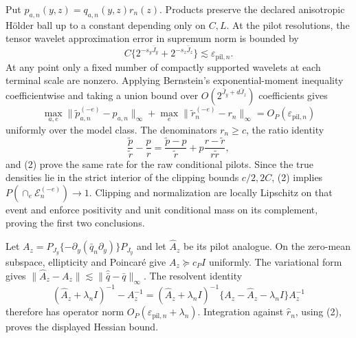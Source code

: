 Put \(p_{a,n}(y,z)=q_{a,n}(y,z)r_n(z)\).  Products preserve the declared anisotropic H\"older ball up to a constant depending only on \(C,L\).  At the pilot resolutions, the tensor wavelet approximation error in supremum norm is bounded by
\[
 C\{2^{-s_y\bar J_y}+2^{-s_z\bar J_z}\}\lesssim\varepsilon_{\mathrm{pil},n}. \tag{1}
\]
At any point only a fixed number of compactly supported wavelets at each terminal scale are nonzero.  Applying Bernstein's exponential-moment inequality coefficientwise and taking a union bound over \(O(2^{\bar J_y+d\bar J_z})\) coefficients gives
\[
 \max_{a,e}\|\widetilde p_{a,n}^{(-e)}-p_{a,n}\|_\infty
 +\max_e\|\widetilde r_n^{(-e)}-r_n\|_\infty
 =O_P(\varepsilon_{\mathrm{pil},n})                     \tag{2}
\]
uniformly over the model class.  The denominators \(r_n\ge c\), the ratio identity
\[
 \frac{\widetilde p}{\widetilde r}-\frac p r
 =\frac{\widetilde p-p}{\widetilde r}
   +p\frac{r-\widetilde r}{{r\widetilde r}},            \tag{3}
\]
and (2) prove the same rate for the raw conditional pilots.  Since the true densities lie in the strict interior of the clipping bounds \(c/2,2C\), (2) implies \(P(\cap_e\mathcal E_n^{(-e)})\to1\).  Clipping and normalization are locally Lipschitz on that event and enforce positivity and unit conditional mass on its complement, proving the first two conclusions.

Let \(A_z=P_{J_y}\{-\partial_y(\bar q_n\partial_y)\}P_{J_y}\) and let \(\widehat A_z\) be its pilot analogue.  On the zero-mean subspace, ellipticity and Poincar\'e give \(A_z\succeq c_PI\) uniformly.  The variational form gives \(\|\widehat A_z-A_z\|\lesssim\|\widehat{\bar q}-\bar q\|_\infty\).  The resolvent identity
\[
 (\widehat A_z+\lambda_nI)^{-1}-A_z^{-1}
 =(\widehat A_z+\lambda_nI)^{-1}
 \{A_z-\widehat A_z-\lambda_nI\}A_z^{-1}              \tag{4}
\]
therefore has operator norm \(O_P(\varepsilon_{\mathrm{pil},n}+\lambda_n)\).  Integration against \(\widehat r_n\), using (2), proves the displayed Hessian bound.

